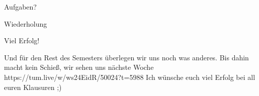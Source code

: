 \documentclass[
  german,            %
  aspectratio=169,    %
]{tumbeamer}
\begin{document}
\begin{frame}[c]{Aufgaben?}{}
	\begin{center}
	  \LARGE Wiederholung
	\end{center}
\end{frame}

\begin{frame}[c]{Viel Erfolg!}{}
  \begin{center}
	Und für den Rest des Semesters überlegen wir uns noch was anderes. Bis dahin macht kein Schieß, wir sehen uns nächste Woche https://tum.live/w/ws24EidR/50024?t=5988
	\LARGE Ich wünsche euch viel Erfolg bei all euren Klausuren ;)
  \end{center}
\end{frame}
\end{document}
